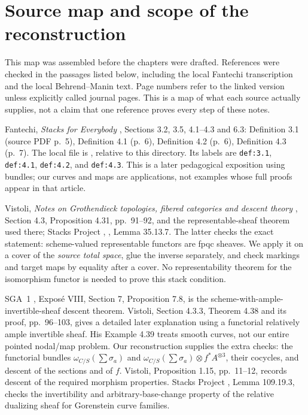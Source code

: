 \chapter{Source map and scope of the reconstruction}\label{app:sources}

This map was assembled before the chapters were drafted. References were
checked in the passages listed below, including the local Fantechi
transcription and the local Behrend--Manin text. Page numbers refer to the
linked version unless explicitly called journal pages. This is a map of
what each source actually supplies, not a claim that one reference proves
every step of these notes.

\begin{description}[style=nextline]
\item[Categories, pullbacks, and the two stack conditions.]
Fantechi, \emph{Stacks for Everybody} \cite{Fantechi}, Sections 3.2,
3.5, 4.1--4.3 and 6.3: Definition 3.1 (source PDF p.~5),
Definition 4.1 (p.~6), Definition 4.2 (p.~6), Definition 4.3 (p.~7).
The local file is
, relative to this
directory. Its labels are \texttt{def:3.1}, \texttt{def:4.1},
\texttt{def:4.2}, and \texttt{def:4.3}.
This is a later pedagogical exposition using bundles; our curves and maps
are applications, not examples whose full proofs appear in that article.

\item[Gluing morphisms, and hence isomorphisms.]
Vistoli, \emph{Notes on Grothendieck topologies, fibered categories and
descent theory} \cite{Vistoli}, Section 4.3, Proposition 4.31,
pp.~91--92, and the representable-sheaf theorem used there;
Stacks Project \cite{Stacks}, , Lemma 35.13.7.
The latter checks the exact statement: scheme-valued representable
functors are fpqc sheaves. We apply it on a cover of the \emph{source
total space}, glue the inverse separately, and check markings and target
maps by equality after a cover. No representability theorem for the
isomorphism functor is needed to prove this stack condition.

\item[Effective descent of the total spaces.]
SGA~1 \cite{SGA1}, Expos\'e VIII, Section 7, Proposition 7.8, is the
scheme-with-ample-invertible-sheaf descent theorem. Vistoli,
Section 4.3.3, Theorem 4.38 and its proof, pp.~96--103, gives a detailed
later explanation using a functorial relatively ample invertible sheaf.
His Example 4.39 treats smooth curves, not our entire pointed nodal/map
problem. Our reconstruction supplies the extra checks: the functorial
bundles $\omega_{C/S}(\sum\sigma_a)$ and
$\omega_{C/S}(\sum\sigma_a)\otimes f^*A^{\otimes3}$, their cocycles,
and descent of the sections and of $f$.
Vistoli, Proposition 1.15, pp.~11--12, records descent of the required
morphism properties. Stacks Project , Lemma 109.19.3,
checks the invertibility and arbitrary-base-change property of the
relative dualizing sheaf for Gorenstein curve families.


\end{description}
